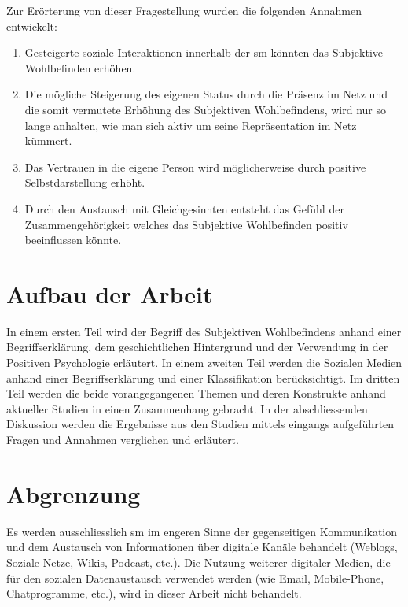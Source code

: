 Zur Erörterung von dieser Fragestellung wurden die folgenden Annahmen entwickelt:

\begin{enumerate}
\item Gesteigerte soziale Interaktionen innerhalb der \gls{sm} könnten das Subjektive Wohlbefinden erhöhen.
\item Die mögliche Steigerung des eigenen Status durch die Präsenz im Netz und die somit vermutete Erhöhung des Subjektiven Wohlbefindens, wird nur so lange anhalten, wie man sich aktiv um seine Repräsentation im Netz kümmert.
\item Das Vertrauen in die eigene Person wird möglicherweise durch positive Selbstdarstellung erhöht.
\item Durch den Austausch mit Gleichgesinnten entsteht das Gefühl der Zusammengehörigkeit welches das Subjektive Wohlbefinden positiv beeinflussen könnte.
\end{enumerate}

\section{Aufbau der Arbeit}\label{sec.aufbau}
In einem ersten Teil wird der Begriff des Subjektiven Wohlbefindens anhand einer Begriffserklärung, dem geschichtlichen Hintergrund und der Verwendung in der Positiven Psychologie erläutert. In einem zweiten Teil werden die Sozialen Medien anhand einer Begriffserklärung und einer Klassifikation berücksichtigt. Im dritten Teil werden die beide vorangegangenen Themen und deren Konstrukte anhand aktueller Studien in einen Zusammenhang gebracht. In der abschliessenden Diskussion werden die Ergebnisse aus den Studien mittels eingangs aufgeführten Fragen und Annahmen verglichen und erläutert. 

\section{Abgrenzung}\label{sec.abgrenzung}
Es werden ausschliesslich \gls{sm} im engeren Sinne der gegenseitigen Kommunikation und dem Austausch von Informationen über digitale Kanäle behandelt (Weblogs, Soziale Netze, Wikis, Podcast, etc.). 
Die Nutzung weiterer digitaler Medien, die für den sozialen Datenaustausch verwendet werden (wie Email, Mobile-Phone, Chatprogramme, etc.), wird in dieser Arbeit nicht behandelt.

